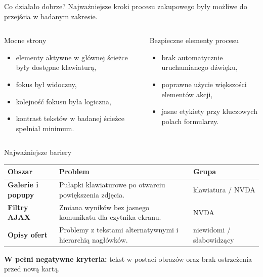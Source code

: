 \documentclass[aspectratio=169,11pt]{beamer}
\newcommand{\tagline}[1]{\textcolor{Slate}{\small #1}}
\begin{document}
\begin{frame}{Co działało dobrze?}
  \tagline{Najważniejsze kroki procesu zakupowego były możliwe do przejścia w badanym zakresie.}

  \vspace{0.25cm}
  \begin{columns}[T,totalwidth=\textwidth]
      \begin{exampleblock}{Mocne strony}
        \begin{itemize}
          \item elementy aktywne w głównej ścieżce były dostępne klawiaturą,
          \item fokus był widoczny,
          \item kolejność fokusu była logiczna,
          \item kontrast tekstów w badanej ścieżce spełniał minimum.
        \end{itemize}
      \end{exampleblock}

      \begin{exampleblock}{Bezpieczne elementy procesu}
        \begin{itemize}
          \item brak automatycznie uruchamianego dźwięku,
          \item poprawne użycie większości elementów akcji,
          \item jasne etykiety przy kluczowych polach formularzy.
        \end{itemize}
      \end{exampleblock}
  \end{columns}
\end{frame}

\begin{frame}{Najważniejsze bariery}
  \small
  \renewcommand{\arraystretch}{1.22}
  \begin{tabularx}{\textwidth}{>{\bfseries}p{} Y p{0.21\textwidth}}
    \toprule
    Obszar & Problem & Grupa \\
    \midrule
    Galerie i popupy &
    Pułapki klawiaturowe po otwarciu powiększenia zdjęcia. &
    klawiatura / NVDA \\
    Filtry AJAX &
    Zmiana wyników bez jasnego komunikatu dla czytnika ekranu. &
    NVDA \\
    Opisy ofert &
    Problemy z tekstami alternatywnymi i hierarchią nagłówków. &
    niewidomi / słabowidzący \\
    \bottomrule
  \end{tabularx}

  \vspace{0.5cm}
  \normalsize
  \textcolor{RiskRed}{\textbf{W pełni negatywne kryteria:}}
  tekst w postaci obrazów oraz brak ostrzeżenia przed nową kartą.
\end{frame}
\end{document}
